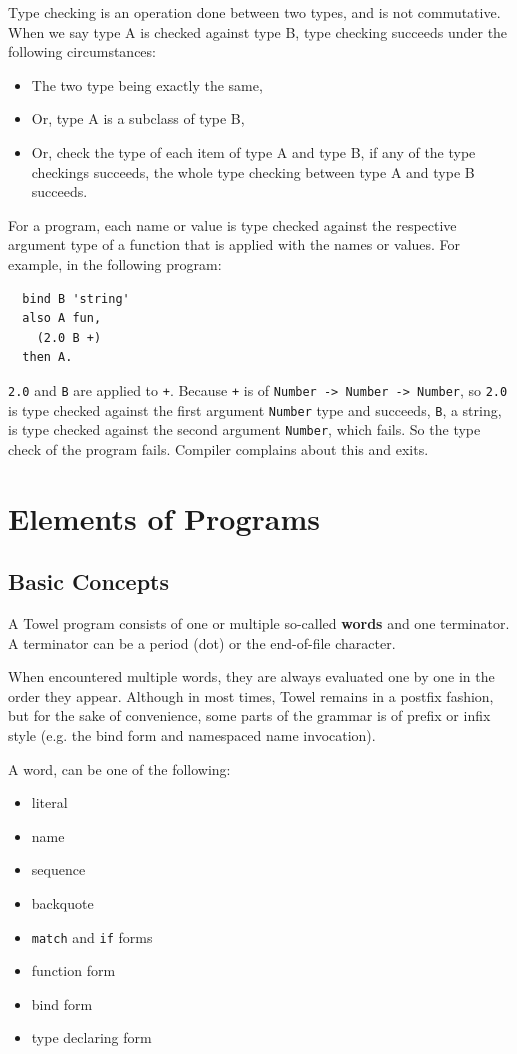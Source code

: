 \documentclass{book}
\begin{document}
Type checking is an operation done between two types, and is not commutative. When we say type A is checked against type B, type checking succeeds under the following circumstances:
\begin{itemize}
\item The two type being exactly the same,
\item Or, type A is a subclass of type B,
\item Or, check the type of each item of type A and type B, if any of the type checkings succeeds, the whole type checking between type A and type B succeeds.
\end{itemize}

For a program, each name or value is type checked against the respective argument type of a function that is applied with the names or values. For example, in the following program:
\begin{verbatim}
  bind B 'string'
  also A fun,
    (2.0 B +)
  then A.
\end{verbatim}

\texttt{2.0} and \texttt{B} are applied to \texttt{+}. Because \texttt{+} is of \texttt{Number -> Number -> Number}, so \texttt{2.0} is type checked against the first argument \texttt{Number} type and succeeds, \texttt{B}, a string, is type checked against the second argument \texttt{Number}, which fails. So the type check of the program fails. Compiler complains about this and exits.

\chapter{Elements of Programs}
\label{chap:forms}

\section{Basic Concepts}

A Towel program consists of one or multiple so-called \textbf{words} and one terminator. A terminator can be a period (dot) or the end-of-file character.

When encountered multiple words, they are always evaluated one by one in the order they appear. Although in most times, Towel remains in a postfix fashion, but for the sake of convenience, some parts of the grammar is of prefix or infix style (e.g. the bind form and namespaced name invocation).

A word, can be one of the following:
\begin{itemize}
\item literal
\item name
\item sequence
\item backquote
\item \texttt{match} and \texttt{if} forms
\item function form
\item bind form
\item type declaring form
\end{itemize}
\end{document}
